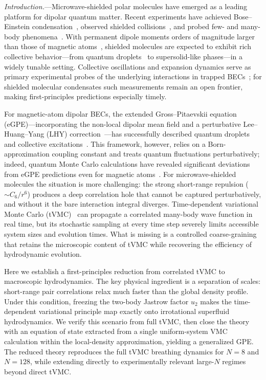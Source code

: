\documentclass[aps,prl,twocolumn,superscriptaddress,longbibliography]{revtex4-2}
\begin{document}
\emph{Introduction.}---Microwave-shielded polar molecules have emerged
as a leading platform for dipolar quantum matter.  Recent experiments
have achieved Bose--Einstein
condensation~\cite{Bigagli2024,Shi2025}, observed shielded
collisions~\cite{Anderegg2021,Schindewolf2022}, and probed few- and
many-body phenomena~\cite{Chen2024,Lin2023,Duda2023}.  With permanent
dipole moments orders of magnitude larger than those of magnetic
atoms~\cite{Chomaz2023,Lahaye2009}, shielded molecules are expected to
exhibit rich collective behavior---from quantum
droplets~\cite{Petrov2015,Wachtler2016} to supersolid-like
phases---in a widely tunable setting.  Collective oscillations and
expansion dynamics serve as primary experimental probes of the
underlying interactions in trapped
BECs~\cite{Dalfovo1999,Jin1996,Mewes1996}; for shielded molecular
condensates such measurements remain an open frontier, making
first-principles predictions especially timely.

For magnetic-atom dipolar BECs, the extended Gross--Pitaevskii equation
(eGPE)---incorporating the non-local dipolar mean field and a
perturbative Lee--Huang--Yang (LHY)
correction~\cite{LimaPelster2011}---has successfully described quantum
droplets and collective excitations~\cite{Wachtler2016,Chomaz2023}.
This framework, however, relies on a Born-approximation coupling
constant and treats quantum fluctuations perturbatively; indeed,
quantum Monte Carlo calculations have revealed significant deviations
from eGPE predictions even for magnetic
atoms~\cite{Bottcher2019}.  For microwave-shielded molecules the
situation is more challenging: the strong short-range repulsion
($\sim C_6/r^6$) produces a deep correlation hole that cannot be
captured perturbatively, and without it the bare interaction integral
diverges.  Time-dependent variational Monte Carlo
(tVMC)~\cite{Carleo2012,Carleo2014,Carleo2017PRX} can propagate a
correlated many-body wave function in real time, but its stochastic
sampling at every time step severely limits accessible system sizes and
evolution times.  What is missing is a controlled coarse-graining that
retains the microscopic content of tVMC while recovering the efficiency
of hydrodynamic evolution.

Here we establish a first-principles reduction from correlated tVMC to
macroscopic hydrodynamics.  The key physical ingredient is a separation
of scales: short-range pair correlations relax much faster than the
global density profile.  Under this condition, freezing the two-body
Jastrow factor $u_2$ makes the time-dependent variational principle map
exactly onto irrotational superfluid hydrodynamics.  We verify this
scenario from full tVMC, then close the theory with an equation of
state extracted from a single uniform-system VMC calculation within the
local-density approximation, yielding a generalized GPE.  The reduced
theory reproduces the full tVMC breathing dynamics for $N=8$ and
$N=128$, while extending directly to experimentally relevant large-$N$
regimes beyond direct tVMC.
\end{document}
